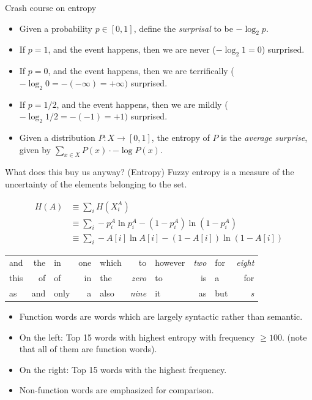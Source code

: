 \documentclass[8pt]{beamer}
\begin{document}
\begin{frame}{Crash course on entropy}
\begin{itemize}
\item Given a probability $p \in [0, 1]$, define the \emph{surprisal} to be $- \log_2 p$. \pause
\item  If $p = 1$, and the event happens, then we are never ($- \log_2 1 = 0$) surprised. \pause
\item  If $p = 0$, and the event happens, then we are terrifically ($- \log_2 0 = - (-\infty) = +\infty)$ surprised. \pause
\item  If $p = 1/2$, and the event happens, then we are mildly ($- \log_2 1/2 = - (-1) = +1)$ surprised. \pause
\item Given a distribution $P: X \to [0, 1]$, the entropy of $P$ is the \emph{average surprise}, given by $\sum_{x \in X} P(x) \cdot - \log P(x)$.  
\end{itemize}
\end{frame}

\begin{frame}{What does this buy us anyway? (Entropy)}
Fuzzy entropy is a measure of the uncertainty of the elements belonging to the set. \pause

\begin{align*} H(A) &\equiv \sum_i H(X^A_i) \\ &\equiv \sum_i
-p_i^A \ln p_i^A - (1 - p_i^A) \ln (1 - p_i^A) \\ &\equiv  \sum_i -A[i] \ln
A[i] - (1 - A[i]) \ln (1 - A[i])
\end{align*}


\begin{tabular}{l r | l r | l r | l r | l r}
and   & the   &   in    &   one         &   which     &   to          &   however &   \emph{two}  &   for     &   \emph{eight}  \\
this    & of    &   of      &   in          &   the       &   \emph{zero} &   to    &   is          &   a     &   for \\
as      & and   &   only  &   a           &   also      &   \emph{nine} &   it    &   as          &   but     &   \emph{s}
\end{tabular}

\begin{itemize}
\item Function words are words which are largely syntactic rather than semantic.
\item On the left: Top 15 words with highest entropy with frequency $\geq 100$. (note that all of them are function words).
\item On the right: Top 15 words with the highest frequency.
\item Non-function words are emphasized for comparison.
\end{itemize}
\end{frame}
\end{document}
